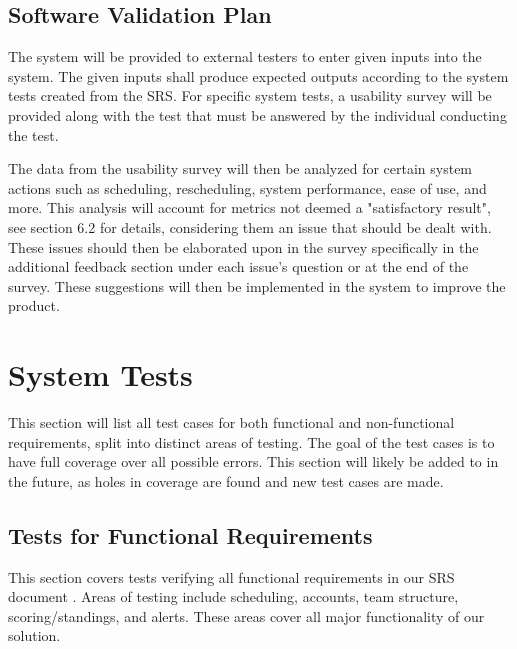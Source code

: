 \documentclass[12pt, titlepage]{article}
\begin{document}
\subsection{Software Validation Plan}


The system will be provided to external testers to enter given inputs into the system. 
The given inputs shall produce expected outputs according to the system tests created 
from the SRS. For specific system tests, a usability survey will be provided along 
with the test that must be answered by the individual conducting the test.

The data from the usability survey will then be analyzed for certain system actions such as
scheduling, rescheduling, system performance, ease of use, and more. This analysis will account for
metrics not deemed a "satisfactory result", see section 6.2 for details, considering them
an issue that should be dealt with. These issues should then be elaborated upon in the
survey specifically in the additional feedback section under each issue's question or at the end
of the survey. These suggestions will then be implemented in the system to improve the product.

\section{System Tests}

This section will list all test cases for both functional and non-functional
requirements, split into distinct areas of testing. The goal of the test cases
is to have full coverage over all possible errors. This section will likely be
added to in the future, as holes in coverage are found and new test cases are
made.

\subsection{Tests for Functional Requirements}

This section covers tests verifying all functional requirements in our SRS
document \cite{SRS}. Areas of testing include scheduling, accounts, team
structure, scoring/standings, and alerts. These areas cover all major
functionality of our solution.
\end{document}
